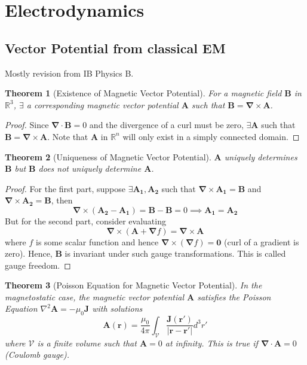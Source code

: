 \documentclass[a4paper]{article}
\theoremstyle{new}
\newtheorem{thm}{Theorem}[section]
\begin{document}
\section{Electrodynamics}
\subsection{Vector Potential from classical EM}
Mostly revision from IB Physics B.
\begin{thm}[Existence of Magnetic Vector Potential]
For a magnetic field $\mathbf{B}$ in $\mathbb{R}^3$, $\exists$ a corresponding magnetic vector potential $\mathbf{A}$ such that $\mathbf{B}=\boldsymbol{\nabla}\times\mathbf{A}$.
\end{thm}
\begin{proof}
Since $\boldsymbol{\nabla}\cdot\mathbf{B}=0$ and the divergence of a curl must be zero, $\exists\mathbf{A}$ such that $\mathbf{B}=\boldsymbol{\nabla}\times\mathbf{A}$. Note that $\mathbf{A}$ in $\mathbb{R}^n$ will only exist in a simply connected domain.
\end{proof}
\begin{thm}[Uniqueness of Magnetic Vector Potential]
$\mathbf{A}$ uniquely determines $\mathbf{B}$ but $\mathbf{B}$ does not uniquely determine $\mathbf{A}$.
\end{thm}
\begin{proof}
For the first part, suppose $\exists\mathbf{A_1},\mathbf{A_2}$ such that $\boldsymbol{\nabla}\times\mathbf{A_1}=\mathbf{B}$ and $\boldsymbol{\nabla}\times\mathbf{A_2}=\mathbf{B}$, then
$$\boldsymbol{\nabla}\times(\mathbf{A_2}-\mathbf{A_1})=\mathbf{B}-\mathbf{B}=0\implies\mathbf{A_1}=\mathbf{A_2}$$
But for the second part, consider evaluating
$$\boldsymbol{\nabla}\times(\mathbf{A}+\boldsymbol{\nabla}f)=\boldsymbol{\nabla}\times\mathbf{A}$$
where $f$ is some scalar function and hence $\boldsymbol{\nabla}\times(\boldsymbol{\nabla}f)=\boldsymbol{0}$ (curl of a gradient is zero). Hence, $\mathbf{B}$ is invariant under such gauge transformations. This is called gauge freedom.
\end{proof}
\begin{thm}[Poisson Equation for Magnetic Vector Potential]
In the magnetostatic case, the magnetic vector potential $\mathbf{A}$ satisfies the Poisson Equation $\nabla^2\mathbf{A}=-\mu_0\mathbf{J}$ with solutions
$$\mathbf{A}(\mathbf{r})=\frac{\mu_0}{4\pi}\int_{\mathcal{V}}\frac{\mathbf{J}(\mathbf{r'})}{|\mathbf{r}-\mathbf{r'}|}d^3r'$$
where $\mathcal{V}$ is a finite volume such that $\mathbf{A}=0$ at infinity. This is true if $\boldsymbol{\nabla}\cdot\mathbf{A}=0$ (Coulomb gauge).
\end{thm}
\end{document}
